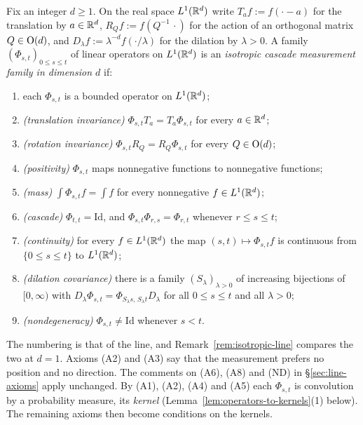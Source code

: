 \begin{definition}\label{def:isotropic-operator-family}
Fix an integer $d \ge 1$. On the real space $L^1(\mathbb{R}^d)$ write $T_af := f(\cdot - a)$ for the
translation by $a \in \mathbb{R}^d$, $R_Qf := f(Q^{-1}\,\cdot)$ for the action of an orthogonal matrix
$Q \in \mathrm{O}(d)$, and $D_\lambda f := \lambda^{-d}f(\cdot/\lambda)$ for the dilation by
$\lambda > 0$. A family $(\Phi_{s,t})_{0 \le s \le t}$ of linear operators on $L^1(\mathbb{R}^d)$ is an
\emph{isotropic cascade measurement family in dimension $d$} if:
\begin{enumerate}
\item[(A1)] each $\Phi_{s,t}$ is a bounded operator on $L^1(\mathbb{R}^d)$;
\item[(A2)] \emph{(translation invariance)} $\Phi_{s,t}T_a = T_a\Phi_{s,t}$ for every
$a \in \mathbb{R}^d$;
\item[(A3)] \emph{(rotation invariance)} $\Phi_{s,t}R_Q = R_Q\Phi_{s,t}$ for every
$Q \in \mathrm{O}(d)$;
\item[(A4)] \emph{(positivity)} $\Phi_{s,t}$ maps nonnegative functions to nonnegative functions;
\item[(A5)] \emph{(mass)} $\int\Phi_{s,t}f = \int f$ for every nonnegative $f \in L^1(\mathbb{R}^d)$;
\item[(A6)] \emph{(cascade)} $\Phi_{t,t} = \mathrm{Id}$, and $\Phi_{s,t}\Phi_{r,s} = \Phi_{r,t}$
whenever $r \le s \le t$;
\item[(A7)] \emph{(continuity)} for every $f \in L^1(\mathbb{R}^d)$ the map $(s,t) \mapsto \Phi_{s,t}f$
is continuous from $\{0 \le s \le t\}$ to $L^1(\mathbb{R}^d)$;
\item[(A8)] \emph{(dilation covariance)} there is a family $(S_\lambda)_{\lambda > 0}$ of
increasing bijections of $[0,\infty)$ with
$D_\lambda\Phi_{s,t} = \Phi_{S_\lambda s,\,S_\lambda t}D_\lambda$ for all $0 \le s \le t$ and all
$\lambda > 0$;
\item[(ND)] \emph{(nondegeneracy)} $\Phi_{s,t} \ne \mathrm{Id}$ whenever $s < t$.
\end{enumerate}
\end{definition}

The numbering is that of the line, and Remark~\ref{rem:isotropic-line} compares the two at $d = 1$.
Axioms (A2) and (A3) say that the measurement prefers no position and no direction. The comments
on (A6), (A8) and (ND) in \S\ref{sec:line-axioms} apply unchanged. By (A1), (A2), (A4) and (A5)
each $\Phi_{s,t}$ is convolution by a probability measure, its \emph{kernel}
(Lemma~\ref{lem:operators-to-kernels}(1) below). The remaining axioms then become conditions on
the kernels.

